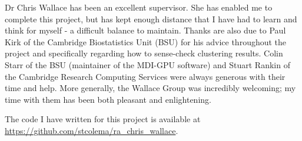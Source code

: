 \documentclass[12pt]{article} %
\begin{document}
	Dr Chris Wallace has been an excellent supervisor. She has enabled me to complete this project, but has kept enough distance that I have had to learn and think for myself - a difficult balance to maintain. Thanks are also due to Paul Kirk of the Cambridge Biostatistics Unit (BSU) for his advice throughout the project and specifically regarding how to sense-check clustering results. Colin Starr of the BSU (maintainer of the MDI-GPU software) and Stuart Rankin of the Cambridge Research Computing Services were always generous with their time and help. More generally, the Wallace Group was incredibly welcoming; my time with them has been both pleasant and enlightening. 
	
	The code I have written for this project is available at \url{https://github.com/stcolema/ra_chris_wallace}.
	
	\newpage
	
	\tableofcontents
	
	\newpage
	
\end{document}
